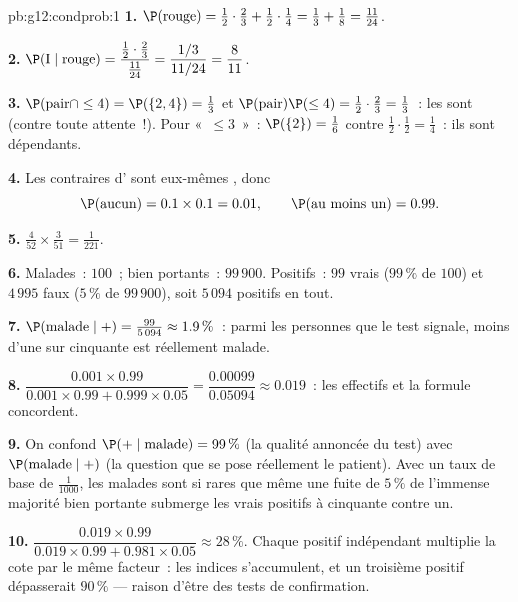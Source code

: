 \begin{solution}{pb:g12:condprob:1}
\textbf{1.} $\P(\text{rouge}) = \frac12 \cdot \frac23 + \frac12
\cdot \frac14 = \frac13 + \frac18 = \frac{11}{24}$.

\textbf{2.} $\P(\text{I} \mid \text{rouge}) =
\dfrac{\frac12 \cdot \frac23}{\frac{11}{24}} =
\dfrac{1/3}{11/24} = \dfrac{8}{11}$.

\textbf{3.} $\P(\text{pair} \cap \leq 4) = \P(\{2, 4\}) =
\frac13$ et $\P(\text{pair})\P(\leq 4) = \frac12 \cdot
\frac23 = \frac13$~: les  sont  (contre toute
attente~!). Pour «~$\leq 3$~»~: $\P(\{2\}) = \frac16$ contre
$\frac12 \cdot \frac12 = \frac14$~: ils sont dépendants.

\textbf{4.} Les  contraires d' 
sont eux-mêmes , donc
\[
\P(\text{aucun}) = 0.1 \times 0.1 = 0.01,
\qquad
\P(\text{au moins un}) = 0.99 .
\]

\textbf{5.} $\frac{4}{52} \times \frac{3}{51} = \frac{1}{221}$.

\textbf{6.} Malades~: $100$~; bien portants~: $99\,900$.
Positifs~: $99$ vrais ($99\,\%$ de $100$) et $4\,995$ faux
($5\,\%$ de $99\,900$), soit $5\,094$ positifs en tout.

\textbf{7.} $\P(\text{malade} \mid +) = \frac{99}{5\,094}
\approx 1.9\,\%$~: parmi les personnes que le test signale, moins
d'une sur cinquante est réellement malade.

\textbf{8.} $\dfrac{0.001 \times 0.99}{0.001 \times 0.99 +
0.999 \times 0.05} = \dfrac{0.00099}{0.05094} \approx 0.019$~: les
effectifs et la formule concordent.

\textbf{9.} On confond $\P(+ \mid \text{malade}) = 99\,\%$ (la
qualité annoncée du test) avec $\P(\text{malade} \mid +)$ (la
question que se pose réellement le patient). Avec un taux de base
de $\frac{1}{1000}$, les malades sont si rares que même une fuite
de $5\,\%$ de l'immense majorité bien portante submerge les vrais
positifs à cinquante contre un.

\textbf{10.} $\dfrac{0.019 \times 0.99}{0.019 \times 0.99 +
0.981 \times 0.05} \approx 28\,\%$. Chaque positif indépendant
multiplie la cote par le même facteur~: les indices s'accumulent,
et un troisième positif dépasserait $90\,\%$ --- raison d'être des
tests de confirmation.


\end{solution}
